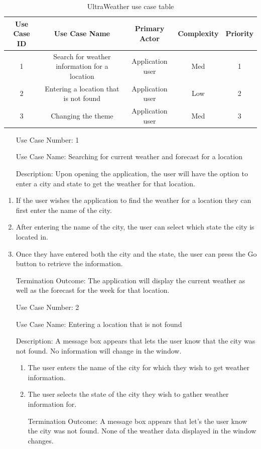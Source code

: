 \documentclass[10pt,conference,onecolumn,compsoc]{IEEEtran}
\begin{document}
\begin{table}
\centering
\begin{tabular}{|c|c|c|c|c|}
\hline
Use Case ID & Use Case Name & Primary Actor & Complexity & Priority \\
\hline \hline
1 & Search for weather information for a location & Application user & Med & 1\\
\hline
2 & Entering a location that is not found & Application user & Low & 2\\
\hline
3 & Changing the theme & Application user & Med & 3\\
\hline

\end{tabular}
\caption{UltraWeather use case table}
\label{tab:useCaseIndex}
\end{table}

\begin{itemize}
\item[Use Case Number:] 1
\item[Use Case Name:] Searching for current weather and forecast for a location
\item[Description:] Upon opening the application, the user will have the option to enter a city and state to get the weather for that location.
\end{itemize}

\begin{enumerate}
\item If the user wishes the application to find the weather for a location they can first enter the name of the city.
\item After entering the name of the city, the user can select which state the city is located in.
\item Once they have entered both the city and the state, the user can press the Go button to retrieve the information.  
\item[Termination Outcome:] The application will display the current weather as well as the forecast for the week for that location.
\end{enumerate}

\begin{itemize}
\item[Use Case Number:] 2
\item[Use Case Name:] Entering a location that is not found
\item[Description:] A message box appears that lets the user know that the city was not found. No information will change in the window.

\begin{enumerate}
\item The user enters the name of the city for which they wish to get weather information.
\item The user selects the state of the city they wish to gather weather information for. 
\item[Termination Outcome:] A message box appears that let's the user know the city was not found. None of the weather data displayed in the window changes.
\end{enumerate}

\end{itemize}
\end{document}
